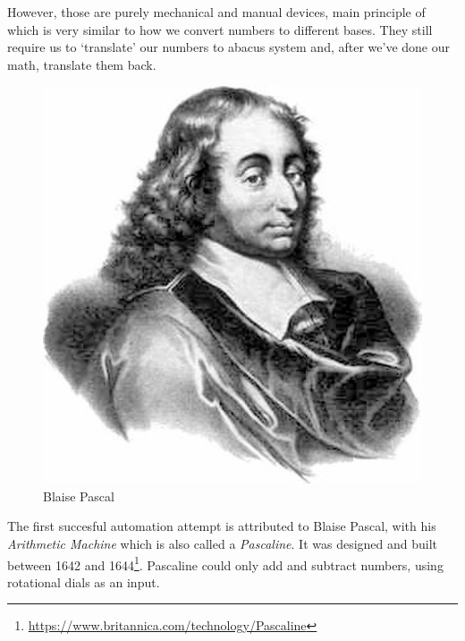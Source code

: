 \documentclass{report}
\begin{document}
            \newpage


            However, those are purely mechanical and manual devices, main principle of which is very similar to how we convert numbers to different bases. They still
            require us to `translate' our numbers to abacus system and, after we've done our math, translate them back. \par
            
            
            \begin{figure}
                \centering
                \includegraphics[scale=0.1]{images/persons/person_blaise_pascal.jpg}
                \caption{Blaise Pascal}
            \end{figure}

            The first succesful automation attempt is attributed to Blaise Pascal, with his \emph{Arithmetic Machine} which is also called a \emph{Pascaline}.
            It was designed and built between 1642 and 1644\footnote{\href{https://www.britannica.com/technology/Pascaline}{https://www.britannica.com/technology/Pascaline}}. 
            Pascaline could only add and subtract numbers, using rotational dials as an input.\par


\end{document}

